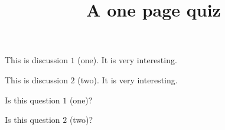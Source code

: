 \documentclass[onepage]{webquiz}
\title{A one page quiz}
\begin{document}
  \begin{discussion}
        This is discussion $1$ (one). It is very interesting.
  \end{discussion}
  \begin{discussion}
     This is discussion $2$ (two). It is very interesting.
  \end{discussion}
  \begin{question} Is this question $1$ (one)? \end{question}
  \begin{question} Is this question $2$ (two)? \end{question}
\end{document}
